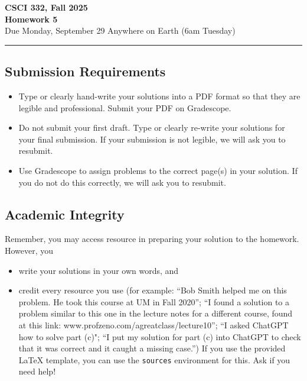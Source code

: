 \documentclass[11pt]{article}
\begin{document}
\begin{center}
\Large\textbf{CSCI 332, Fall 2025}%
\\
\LARGE\textbf{Homework 5}%
\\[0.5ex]
\large Due Monday, September 29 Anywhere on Earth (6am Tuesday)
\end{center}

\bigskip
\hrule
\bigskip

\subsection*{Submission Requirements}
\begin{itemize}
    \item Type or clearly hand-write your solutions into a PDF format so that they are legible and professional. Submit your PDF on Gradescope. 
    \item Do not submit your first draft. Type or clearly re-write your solutions for your final submission. If your submission is not legible, we will ask you to resubmit.
    \item Use Gradescope to assign problems to the correct page(s) in your solution. If you do not do this correctly, we will ask you to resubmit.
\end{itemize}

\subsection*{Academic Integrity}

Remember, you may access  resource in preparing your solution to the homework. However, you 
\begin{itemize}
    \item write your solutions in your own words, and
    \item credit every resource you use (for example: ``Bob Smith helped me on
    this problem. He took this course at UM in Fall 2020''; ``I found a solution
    to a problem similar to this one in the lecture notes for a different
    course, found at this link: www.profzeno.com/agreatclass/lecture10''; ``I
    asked ChatGPT how to solve  part (c)"; ``I put my solution for part (c) into
    ChatGPT to check that it was correct and it caught a missing case.'') If you
    use the provided LaTeX template, you can use the \texttt{sources}
    environment for this. Ask if you need help!
\end{itemize}
\end{document}
